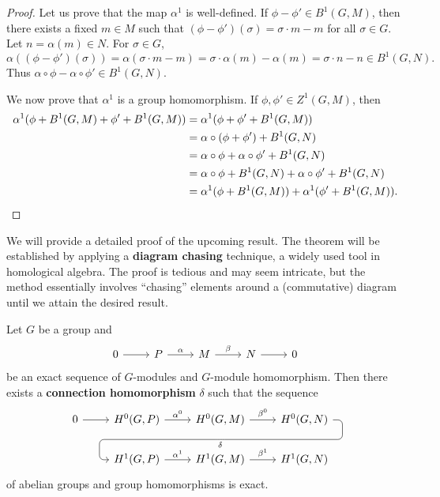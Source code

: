\begin{proof}
    Let us prove that the map $\alpha^1$ is well-defined. If 
    $\phi-\phi'\in B^1(G,M)$, then 
    there exists a fixed 
    $m\in M$ such that 
    $(\phi-\phi')(\sigma)=\sigma\cdot m-m$ for all $\sigma\in G$. 
    Let $n=\alpha(m)\in N$. 
    For $\sigma\in G$, 
    \[
    \alpha((\phi-\phi')(\sigma))=\alpha(\sigma\cdot m-m)
    =\sigma\cdot \alpha(m)-\alpha(m)=\sigma\cdot n-n\in B^1(G,N). 
    \]
    Thus $\alpha\circ\phi-\alpha\circ\phi'\in B^1(G,N)$. 

    We now prove that $\alpha^1$ is a group homomorphism. If 
    $\phi,\phi'\in Z^1(G,M)$, then 
    \begin{align*}
    \alpha^1(\phi+B^1(G,M)+\phi'+B^1(G,M))
    &=\alpha^1(\phi+\phi'+B^1(G,M))\\
    &=\alpha\circ(\phi+\phi')+B^1(G,N)\\
    &=\alpha\circ\phi+\alpha\circ\phi'+B^1(G,N)\\
    &=\alpha\circ\phi+B^1(G,N)+\alpha\circ\phi'+B^1(G,N)\\
    &=\alpha^1(\phi+B^1(G,M))+\alpha^1(\phi'+B^1(G,M)).\qedhere
    \end{align*}
\end{proof}

We will provide a detailed proof of the upcoming result. 
The theorem will be established by applying a \textbf{diagram chasing} technique, a widely used tool in homological algebra.
The proof is tedious and may seem intricate, but the method essentially 
involves ``chasing'' elements around a (commutative) diagram until we attain the desired result. 

\begin{theorem}
Let $G$ be a group and 
\[
\begin{tikzcd}
    0 & P & M & N & 0
    \arrow[from=1-1, to=1-2]
    \arrow["\alpha", from=1-2, to=1-3]
    \arrow["\beta", from=1-3, to=1-4]
    \arrow[from=1-4, to=1-5]
    \end{tikzcd}
\] 
be an exact sequence of $G$-modules and $G$-module homomorphism. 
Then there exists a \textbf{connection homomorphism} $\delta$ such that the sequence 
\begin{equation}
\label{eq:long}
\begin{tikzcd}
 0\rar & H^0(G,P)\rar["\alpha^0"] & H^0(G,M) \rar["\beta^0"]
             \ar[draw=none]{d}[name=X, anchor=center]{}
    & H^0(G,N) \ar[rounded corners,
            to path={ -- ([xshift=2ex]\tikztostart.east)
                      |- (X.center) \tikztonodes
                      -| ([xshift=-2ex]\tikztotarget.west)
                      -- (\tikztotarget)}]{dll}[at end]{\delta} \\      
  &H^1(G,P) \rar["\alpha^1"] & H^1(G,M) \rar["\beta^1"] & H^1(G,N)
\end{tikzcd}
\end{equation}
of abelian groups
and group homomorphisms is exact. 
\end{theorem}

